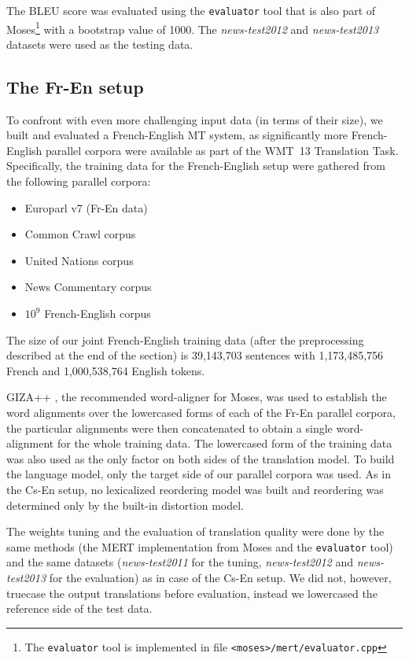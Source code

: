 The BLEU score was evaluated using the \texttt{evaluator} tool that is also part of
Moses\footnote{The \texttt{evaluator} tool is implemented in file \texttt{<moses>/mert/evaluator.cpp}}
with a bootstrap value of 1000.
The \emph{news-test2012} and \emph{news-test2013} datasets were used as the testing data.

\subsection{The Fr-En setup}

To confront \eppex{} with even more challenging input data (in terms of their size),
we built and evaluated a French-English MT system, as significantly more French-English parallel
corpora were available as part of the WMT~13 Translation Task. Specifically, the training data for
the French-English setup were gathered from the following parallel corpora:
\begin{itemize}
  \item Europarl v7 (Fr-En data)
  \item Common Crawl corpus
  \item United Nations corpus
  \item News Commentary corpus
  \item $10^9$ French-English corpus
\end{itemize}
The size of our joint French-English training data (after the preprocessing described
at the end of the section) is 39,143,703 sentences with 1,173,485,756 French and 1,000,538,764
English tokens.

GIZA++ \citep{och:giza}, the recommended word-aligner for Moses,
was used to establish the word alignments over the lowercased forms of each
of the Fr-En parallel corpora, the particular alignments were then concatenated to
obtain a single word-alignment for the whole training data.
The lowercased form of the training data was also used as the only factor on both sides of
the translation model.
To build the language model, only the target side of our parallel corpora was used.
As in the Cs-En setup, no lexicalized reordering model was built and reordering was
determined only by the built-in distortion model.

The weights tuning and the evaluation of translation quality were done by the same methods
(the MERT implementation from Moses and the \texttt{evaluator} tool) and the same datasets
(\emph{news-test2011} for the tuning, \emph{news-test2012} and \emph{news-test2013} for
the evaluation) as in case of the Cs-En setup. We did not, however, truecase the
output translations before evaluation, instead we lowercased the reference side of the test data.

